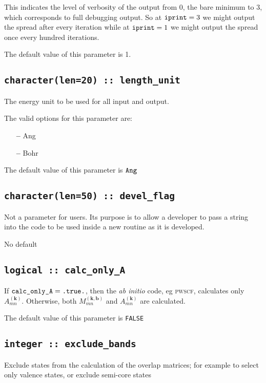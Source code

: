 This indicates the level of verbosity of the output from 0,
the bare minimum to 3, which corresponds to full debugging output. So at
$\verb#iprint#=3$ we might output the spread after every iteration while
at $\verb#iprint#=1$ we might output the spread once every hundred iterations.

The default value of this parameter is 1.

\subsection[length\_unit]{\tt character(len=20) :: length\_unit}
The energy unit to be used for all input and output.

The valid options for this parameter are:
\begin{itemize}
\item[{\bf --}]  Ang
\item[{\bf --}]  Bohr
\end{itemize}

 The default value of this parameter is $\verb#Ang#$

\subsection[devel\_flag]{\tt character(len=50) :: devel\_flag}

Not a parameter for users. Its purpose is to allow a developer to pass a
string into the code to be used inside a new routine as it is developed.

No default

\subsection[calc\_only\_A]{\tt logical :: calc\_only\_A}

If $\verb#calc_only_A#=\verb#.true.#$, then the \textit{ab initio}
code, eg \textsc{pwscf},
calculates only $A_{mn}^{(\mathbf{k})}$. Otherwise, both
$M_{mn}^{(\mathbf{k,b})}$ and $A_{mn}^{(\mathbf{k})}$ are
calculated.

The default value of this parameter is \verb#FALSE#


\subsection[exclude\_bands]{\tt integer :: exclude\_bands}

Exclude states from the calculation of the overlap matrices; for example to select only valence states, or exclude semi-core states

